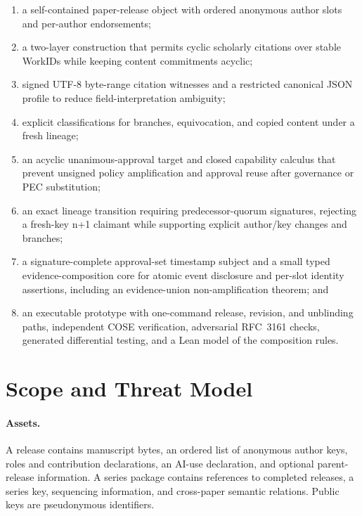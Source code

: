 \documentclass[11pt]{article}
\newcommand{\workid}{\textsf{WorkID}}
\begin{document}
\begin{enumerate}
  \item a self-contained paper-release object with ordered anonymous author slots and per-author endorsements;
  \item a two-layer construction that permits cyclic scholarly citations over stable \workid s while keeping content commitments acyclic;
  \item signed UTF-8 byte-range citation witnesses and a restricted canonical JSON profile to reduce field-interpretation ambiguity;
  \item explicit classifications for branches, equivocation, and copied content under a fresh lineage;
  \item an acyclic unanimous-approval target and closed capability calculus that prevent unsigned policy amplification and approval reuse after governance or PEC substitution;
  \item an exact lineage transition requiring predecessor-quorum signatures, rejecting a fresh-key n+1 claimant while supporting explicit author/key changes and branches;
  \item a signature-complete approval-set timestamp subject and a small typed
        evidence-composition core for atomic event disclosure and per-slot
        identity assertions, including an evidence-union non-amplification
        theorem; and
  \item an executable prototype with one-command release, revision, and
        unblinding paths, independent COSE verification, adversarial RFC~3161
        checks, generated differential testing, and a Lean model of the
        composition rules.
\end{enumerate}

\section{Scope and Threat Model}

\paragraph{Assets.} A release contains manuscript bytes, an ordered list of anonymous author keys, roles and contribution declarations, an AI-use declaration, and optional parent-release information. A series package contains references to completed releases, a series key, sequencing information, and cross-paper semantic relations. Public keys are pseudonymous identifiers.
\end{document}
